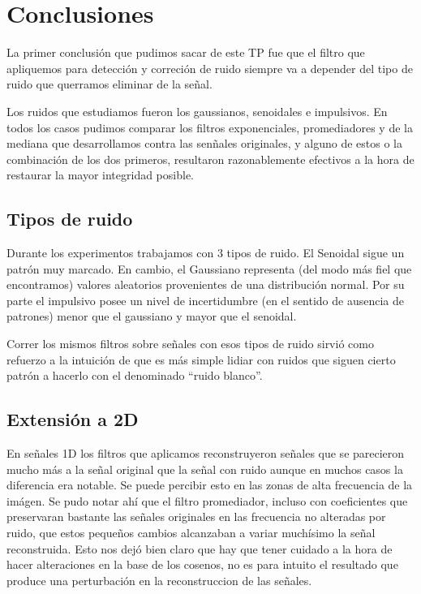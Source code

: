 \section{Conclusiones}

La primer conclusi\'on que pudimos sacar de este TP fue que el filtro que apliquemos para detecci\'on y correci\'on
de ruido siempre va a depender del tipo de ruido que querramos eliminar de la se\~nal.

Los ruidos que estudiamos fueron los gaussianos, senoidales e impulsivos. En todos los casos pudimos comparar los filtros
exponenciales, promediadores y de la mediana que desarrollamos contra las sen\~nales originales, y alguno de estos o la combinaci\'on de los dos primeros, resultaron razonablemente efectivos a la hora de restaurar la mayor integridad posible.

\subsection{Tipos de ruido}

Durante los experimentos trabajamos con 3 tipos de ruido. El Senoidal sigue un
patr\'on muy marcado. En cambio, el Gaussiano representa (del modo m\'as fiel
que encontramos) valores aleatorios provenientes de una distribuci\'on normal.
Por su parte el impulsivo posee un nivel de incertidumbre (en el sentido de ausencia de patrones)
menor que el gaussiano y mayor que el senoidal.

Correr los mismos filtros sobre se\~nales con esos tipos de ruido sirvi\'o como
refuerzo a la intuici\'on de que es m\'as simple lidiar con ruidos que siguen
cierto patr\'on a hacerlo con el denominado ``ruido blanco''.

\subsection{Extensi\'on a 2D}

En se\~nales 1D los filtros que aplicamos reconstruyeron se\~nales que se parecieron mucho m\'as a la se\~nal
original que la se\~nal con ruido aunque en muchos casos la diferencia era notable. Se puede percibir esto en las zonas
de alta frecuencia de la im\'agen. Se pudo notar ah\'i que el filtro promediador, incluso con coeficientes que preservaran
bastante las se\~nales originales en las frecuencia no alteradas por ruido, que estos peque\~nos cambios alcanzaban a
variar much\'isimo la se\~nal reconstruida. Esto nos dej\'o bien claro que hay que tener cuidado a la hora de hacer alteraciones
en la base de los cosenos, no es para intuito el resultado que produce una perturbaci\'on en la reconstruccion de las se\~nales.


